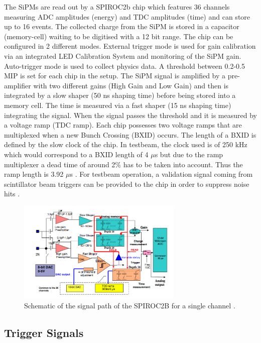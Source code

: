 \documentclass[twoside,a4paper,11pt]{article}
\begin{document}
The SiPMs are read out by a SPIROC2b chip which features 36 channels measuring ADC amplitudes (energy) and TDC amplitudes (time) and can store up to 16 events. The collected charge from the SiPM is stored in a capacitor (memory-cell) waiting to be digitised with a 12 bit range. The chip can be configured in 2 different modes. External trigger mode is used for gain calibration via an integrated LED Calibration System and monitoring of the SiPM gain. Auto-trigger mode is used to collect physics data. A threshold between 0.2-0.5 MIP is set for each chip in the setup. The SiPM signal is amplified by a pre-amplifier with two different gains (High Gain and Low Gain) and then is integrated by a slow shaper (50 ns shaping time) before being stored into a memory cell. The time is measured via a fast shaper (15 ns shaping time) integrating the signal. When the signal passes the threshold and it is measured by a voltage ramp (TDC ramp). Each chip possesses two voltage ramps that are multiplexed when a new Bunch Crossing (BXID) occurs. The length of a BXID is defined by the slow clock of the chip. In testbeam, the clock used is of 250 kHz which would correspond to a BXID length of 4 $\mu$s but due to the ramp multiplexer a dead time of around 2\% has to be taken into account. Thus the ramp length is 3.92 $\mu$s \cite{EldwanSSP}. For testbeam operation, a validation signal coming from scintillator beam triggers can be provided to the chip in order to suppress noise hits \cite{DAQ}.\\
\begin{figure}[htbp]
\begin{center}
\includegraphics[width=0.7\textwidth]{fig/Others/Spiroc_layout.png}
\caption{Schematic of the signal path of the SPIROC2B for a single channel \cite{SPIROCManual}.}
\label{fig:SPIROC2B}
\end{center}
\end{figure}

\subsection{Trigger Signals}
\label{subsec:trigger}
\end{document}
